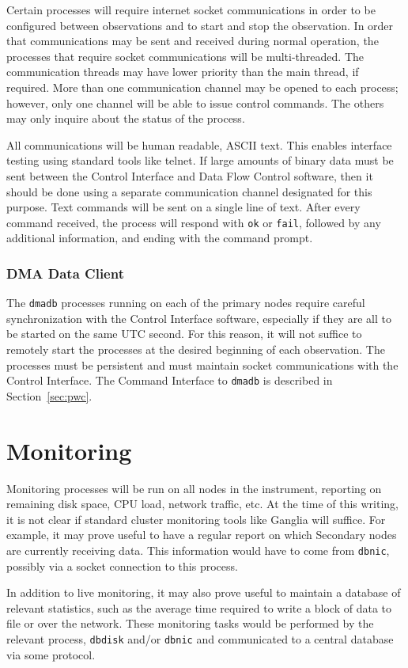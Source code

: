 Certain processes will require internet socket communications in order
to be configured between observations and to start and stop the
observation.  In order that communications may be sent and received
during normal operation, the processes that require socket
communications will be multi-threaded.  The communication threads may
have lower priority than the main thread, if required.  More than one
communication channel may be opened to each process; however, only one
channel will be able to issue control commands.  The others may only
inquire about the status of the process.

All communications will be human readable, ASCII text.  This enables
interface testing using standard tools like telnet.  If large amounts
of binary data must be sent between the Control Interface and Data
Flow Control software, then it should be done using a separate
communication channel designated for this purpose.  Text commands will
be sent on a single line of text.  After every command received, the
process will respond with {\tt ok} or {\tt fail}, followed by any
additional information, and ending with the command prompt.

\subsubsection{DMA Data Client}

The {\tt dmadb} processes running on each of the primary nodes
require careful synchronization with the Control Interface software,
especially if they are all to be started on the same UTC second.  For
this reason, it will not suffice to remotely start the processes at
the desired beginning of each observation.  The processes must be
persistent and must maintain socket communications with the Control
Interface.  The Command Interface to {\tt dmadb} is described in
Section~\ref{sec:pwc}.

\section{Monitoring}

Monitoring processes will be run on all nodes in the instrument,
reporting on remaining disk space, CPU load, network traffic, etc.  At
the time of this writing, it is not clear if standard cluster
monitoring tools like Ganglia will suffice.  For example, it may prove
useful to have a regular report on which Secondary nodes are currently
receiving data.  This information would have to come from {\tt dbnic},
possibly via a socket connection to this process.

In addition to live monitoring, it may also prove useful to maintain a
database of relevant statistics, such as the average time required to
write a block of data to file or over the network.  These monitoring
tasks would be performed by the relevant process, {\tt dbdisk} and/or
{\tt dbnic} and communicated to a central database via some protocol.
